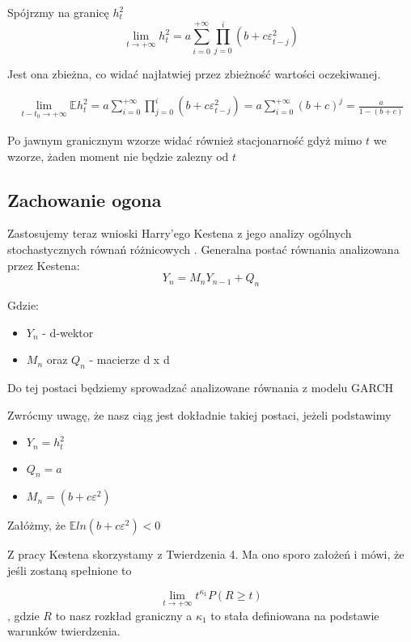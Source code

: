 \documentclass[12pt]{article}
\begin{document}
Spójrzmy na granicę $h_t^2$ 
\[
\lim_{t \rightarrow +\infty} h_t^2 = a\sum_{i=0}^{+\infty}\prod_{j=0}^i(b+c\varepsilon_{t-j}^2)
\]

Jest ona zbieżna, co widać najłatwiej przez zbieżność wartości oczekiwanej.

\begin{equation}
	\begin{aligned}
\lim_{t-t_0 \rightarrow +\infty} \mathbb{E}h_t^2 = a\sum_{i=0}^{+\infty}\prod_{j=0}^i(b+c\varepsilon_{t-j}^2) = a\sum_{i=0}^{+\infty}(b+c)^j = \frac{a}{1-(b+c)} 
	\end{aligned}
\end{equation}

Po jawnym granicznym wzorze widać również stacjonarność gdyż mimo $t$ we wzorze, żaden moment nie będzie zalezny od $t$

\subsection{Zachowanie ogona}

Zastosujemy teraz wnioski  Harry'ego Kestena z jego analizy ogólnych stochastycznych równań różnicowych \cite{kesten}. 
Generalna postać równania analizowana przez Kestena:
	 \[
    Y_n = M_nY_{n-1} + Q_n
  \]
  
Gdzie: \begin{itemize}
\item $Y_n$ - d-wektor
\item $M_n$ oraz $Q_n$ - macierze d x d
\end{itemize}

Do tej postaci będziemy sprowadzać analizowane równania z modelu GARCH

Zwrócmy uwagę, że nasz ciąg jest dokładnie takiej postaci, jeżeli podstawimy \begin{itemize}
\item $Y_n = h_t^2$
\item $Q_n = a$
\item $M_n = (b+c\varepsilon^2)$
\end{itemize}

Załóżmy, że $\mathbb{E}ln(b+c\varepsilon^2) < 0$

Z pracy Kestena skorzystamy z Twierdzenia 4. Ma ono sporo założeń i mówi, że jeśli zostaną spełnione to 

\[
\lim_{t \rightarrow +\infty} t^{\kappa_1}  P(R \geq t) 
\], gdzie
$R$ to nasz rozkład graniczny
a $\kappa_1$ to stała definiowana na podstawie warunków twierdzenia.
\end{document}
